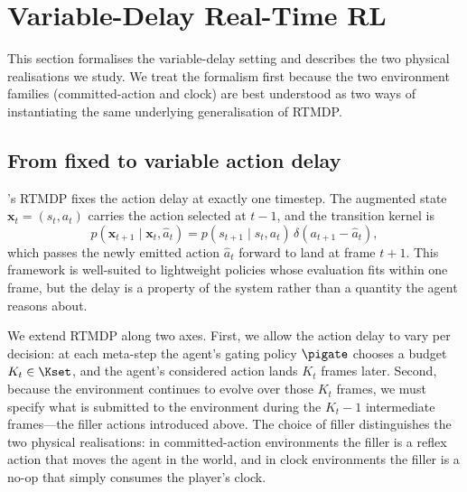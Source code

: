 \section{Variable-Delay Real-Time RL}
\label{sec:envs}

This section formalises the variable-delay setting and describes the
two physical realisations we study.
We treat the formalism first because the two environment families
(committed-action and clock) are best understood as two ways of
instantiating the same underlying generalisation of RTMDP.

\subsection{From fixed to variable action delay}

\citet{ramstedt2019rtrl}'s RTMDP fixes the action delay at exactly one
timestep.
The augmented state $\mathbf{x}_t = (s_t, a_t)$ carries the action
selected at $t{-}1$, and the transition kernel is
\begin{equation}
  p(\mathbf{x}_{t+1} \mid \mathbf{x}_t, \hat{a}_t)
  = p(s_{t+1} \mid s_t, a_t)\,\delta(a_{t+1} - \hat{a}_t),
\end{equation}
which passes the newly emitted action $\hat{a}_t$ forward to land at
frame $t{+}1$.
This framework is well-suited to lightweight policies whose evaluation
fits within one frame, but the delay is a property of the system rather
than a quantity the agent reasons about.

We extend RTMDP along two axes.
First, we allow the action delay to vary per decision: at each meta-step
the agent's gating policy $\pigate$ chooses a budget $K_t \in \Kset$,
and the agent's considered action lands $K_t$ frames later.
Second, because the environment continues to evolve over those $K_t$
frames, we must specify what is submitted to the environment during the
$K_t{-}1$ intermediate frames---the filler actions introduced above.
The choice of filler distinguishes the two physical realisations: in
committed-action environments the filler is a reflex action that moves
the agent in the world, and in clock environments the filler is a no-op
that simply consumes the player's clock.

